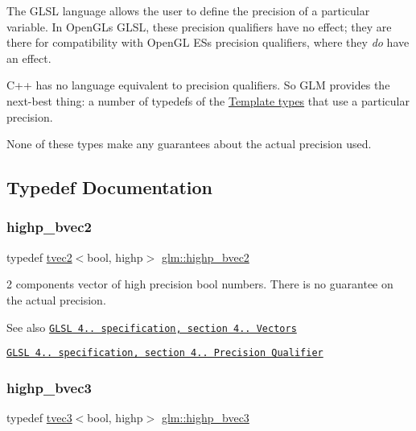 The G\+L\+SL language allows the user to define the precision of a particular variable. In Open\+GL\textquotesingle{}s G\+L\+SL, these precision qualifiers have no effect; they are there for compatibility with Open\+GL ES\textquotesingle{}s precision qualifiers, where they {\itshape do} have an effect.

C++ has no language equivalent to precision qualifiers. So G\+LM provides the next-\/best thing\+: a number of typedefs of the \hyperlink{group__core__template}{Template types} that use a particular precision.

None of these types make any guarantees about the actual precision used. 

\subsection{Typedef Documentation}
\mbox{\label{group__core__precision_gaf76ced5823e8aace6bd257fac6c250cb}} 
\subsubsection{\texorpdfstring{highp\+\_\+bvec2}{highp\_bvec2}}
{\footnotesize\ttfamily typedef \hyperlink{structglm_1_1tvec2}{tvec2}$<$bool, highp$>$ \hyperlink{group__core__precision_gaf76ced5823e8aace6bd257fac6c250cb}{glm\+::highp\+\_\+bvec2}}

2 components vector of high precision bool numbers. There is no guarantee on the actual precision.

\begin{DoxySeeAlso}{See also}
\href{http://www.opengl.org/registry/doc/GLSLangSpec.4.20.8.pdf}{\tt G\+L\+SL 4.. specification, section 4.. Vectors} 

\href{http://www.opengl.org/registry/doc/GLSLangSpec.4.20.8.pdf}{\tt G\+L\+SL 4.. specification, section 4.. Precision Qualifier} 
\end{DoxySeeAlso}
\mbox{\label{group__core__precision_gac35c0ff5b9eead09e905b4aa09d1e954}} 
\subsubsection{\texorpdfstring{highp\+\_\+bvec3}{highp\_bvec3}}
{\footnotesize\ttfamily typedef \hyperlink{structglm_1_1tvec3}{tvec3}$<$bool, highp$>$ \hyperlink{group__core__precision_gac35c0ff5b9eead09e905b4aa09d1e954}{glm\+::highp\+\_\+bvec3}}

